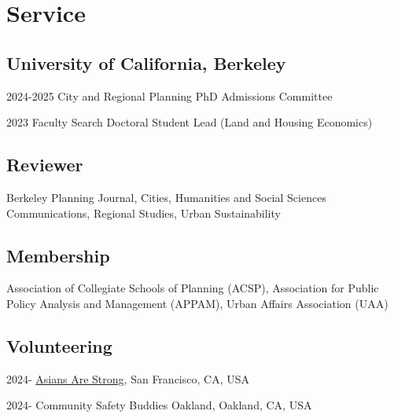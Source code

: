 \documentclass[12pt,letterpaper]{report}
\begin{document}
  \section*{Service}
  \subsection*{University of California, Berkeley}
    \begin{tablist}
        \item[2024-2025] \tab{}City and Regional Planning PhD Admissions Committee
        \item[2023] \tab{}Faculty Search Doctoral Student Lead (Land and Housing Economics)
    \end{tablist}
  \subsection*{Reviewer}
    Berkeley Planning Journal, Cities, Humanities and Social Sciences Communications, Regional Studies, Urban Sustainability
  \subsection*{Membership}
    Association of Collegiate Schools of Planning (ACSP), Association for Public Policy Analysis and Management (APPAM), Urban Affairs Association (UAA)
  \subsection*{Volunteering}
    \begin{tablist}
        \item[2024-] \tab{}\href{https://asiansarestrong.org/}{Asians Are Strong}, San Francisco, CA, USA
        \item[2024-] \tab{}Community Safety Buddies Oakland, Oakland, CA, USA
    \end{tablist}
\end{document}
